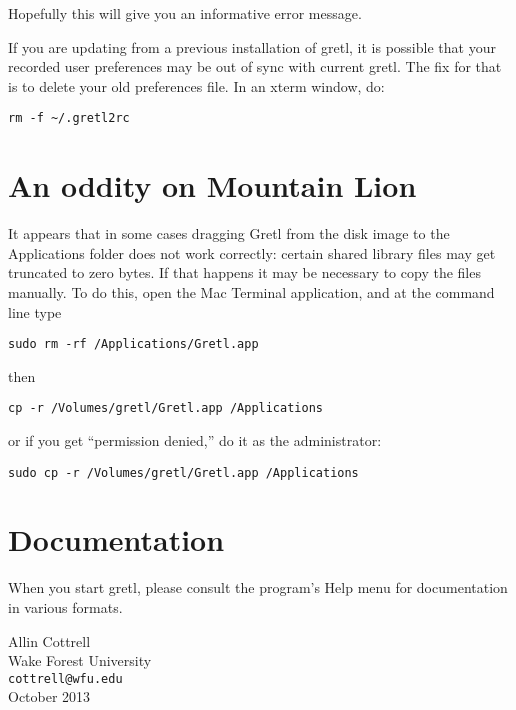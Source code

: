 \documentclass[11pt]{article}
\begin{document}
Hopefully this will give you an informative error message.

If you are updating from a previous installation of gretl, it
is possible that your recorded user preferences may be out of
sync with current gretl.  The fix for that is to delete
your old preferences file.  In an xterm window, do:

\begin{verbatim}
rm -f ~/.gretl2rc
\end{verbatim}

\section{An oddity on Mountain Lion}

It appears that in some cases dragging \textsf{Gretl} from the disk
image to the \textsf{Applications} folder does not work correctly:
certain shared library files may get truncated to zero bytes. If that
happens it may be necessary to copy the files manually. To do this,
open the Mac Terminal application, and at the command line type

\begin{verbatim}
sudo rm -rf /Applications/Gretl.app
\end{verbatim}

then

\begin{verbatim}
cp -r /Volumes/gretl/Gretl.app /Applications
\end{verbatim}

or if you get ``permission denied,'' do it as the administrator:

\begin{verbatim}
sudo cp -r /Volumes/gretl/Gretl.app /Applications
\end{verbatim}

\section{Documentation}
\label{sec:doc}

When you start gretl, please consult the program's Help menu for
documentation in various formats.

\vspace{.25in}

\raggedright
Allin Cottrell \\
Wake Forest University \\
\texttt{cottrell@wfu.edu} \\
October 2013
\end{document}
